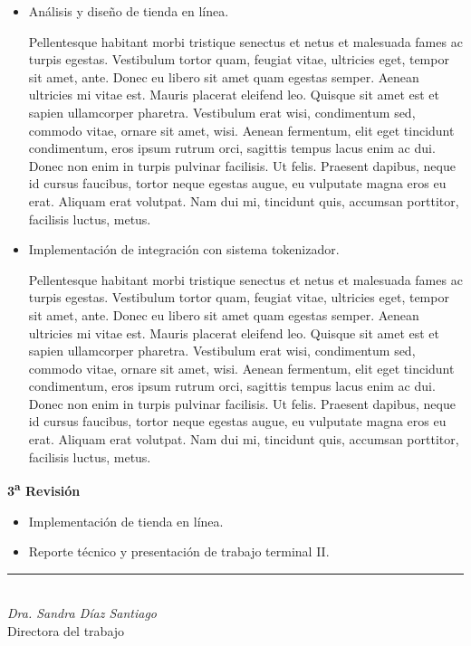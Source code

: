 \documentclass[10pt, letterpaper]{article}
\begin{document}
  \begin{itemize}

    \item Análisis y diseño de tienda en línea.

      Pellentesque habitant morbi tristique senectus et netus et malesuada fames
      ac turpis egestas. Vestibulum tortor quam, feugiat vitae, ultricies eget,
      tempor sit amet, ante. Donec eu libero sit amet quam egestas semper.
      Aenean ultricies mi vitae est. Mauris placerat eleifend leo. Quisque sit
      amet est et sapien ullamcorper pharetra. Vestibulum erat wisi, condimentum
      sed, commodo vitae, ornare sit amet, wisi. Aenean fermentum, elit eget
      tincidunt condimentum, eros ipsum rutrum orci, sagittis tempus lacus enim
      ac dui. Donec non enim in turpis pulvinar facilisis. Ut felis. Praesent
      dapibus, neque id cursus faucibus, tortor neque egestas augue, eu
      vulputate magna eros eu erat. Aliquam erat volutpat. Nam dui mi, tincidunt
      quis, accumsan porttitor, facilisis luctus, metus.

    \item Implementación de integración con sistema tokenizador.

      Pellentesque habitant morbi tristique senectus et netus et malesuada fames
      ac turpis egestas. Vestibulum tortor quam, feugiat vitae, ultricies eget,
      tempor sit amet, ante. Donec eu libero sit amet quam egestas semper.
      Aenean ultricies mi vitae est. Mauris placerat eleifend leo. Quisque sit
      amet est et sapien ullamcorper pharetra. Vestibulum erat wisi, condimentum
      sed, commodo vitae, ornare sit amet, wisi. Aenean fermentum, elit eget
      tincidunt condimentum, eros ipsum rutrum orci, sagittis tempus lacus enim
      ac dui. Donec non enim in turpis pulvinar facilisis. Ut felis. Praesent
      dapibus, neque id cursus faucibus, tortor neque egestas augue, eu
      vulputate magna eros eu erat. Aliquam erat volutpat. Nam dui mi, tincidunt
      quis, accumsan porttitor, facilisis luctus, metus.

  \end{itemize}

  \noindent
  \textbf{3\textsuperscript{a} Revisión}

  \begin{itemize}

    \item Implementación de tienda en línea.

    \item Reporte técnico y presentación de trabajo terminal II.

  \end{itemize}

  \vspace{0.5in}
  \begin{center}
    \rule{3in}{0.4pt} \\
    \textit{Dra. Sandra Díaz Santiago} \\
    Directora del trabajo
  \end{center}
\end{document}
